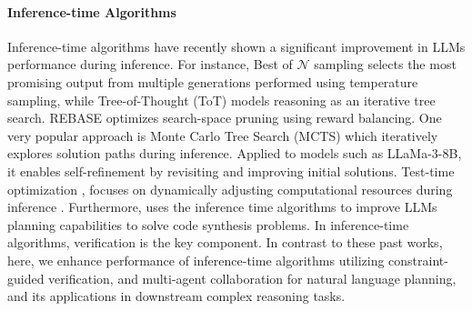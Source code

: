 

\paragraph{Inference-time Algorithms}

Inference-time algorithms have recently shown a significant improvement in LLMs performance during inference. For instance, Best of $\mathcal{N}$ sampling \citep{brown2024large} selects the most promising output from multiple generations performed using temperature sampling, while Tree-of-Thought (ToT) \citep{yao2024tree} models reasoning as an iterative tree search. REBASE \citep{wu2024empirical} optimizes search-space pruning using reward balancing. One very popular approach is Monte Carlo Tree Search (MCTS) \citep{zhang2024accessing} which iteratively explores solution paths during inference. Applied to models such as LLaMa-3-8B, it enables self-refinement by revisiting and improving initial solutions. Test-time optimization \citep{snell2024scaling}, focuses on dynamically adjusting computational resources during inference \citep{wu2024empirical}. Furthermore, \citet{wang2025planning} uses the inference time algorithms to improve LLMs planning capabilities to solve code synthesis problems. In inference-time algorithms, verification is the key component. In contrast to these past works, here, we enhance performance of inference-time algorithms utilizing constraint-guided verification, and multi-agent collaboration for natural language planning, and its applications in downstream complex reasoning tasks.

